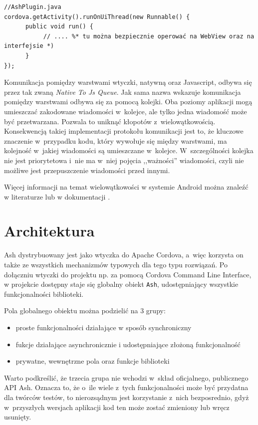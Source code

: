 \documentclass[brudnopis]{xmgr}
\begin{document}
\begin{lstlisting}
//AshPlugin.java
cordova.getActivity().runOnUiThread(new Runnable() {
      public void run() {
           // .... %* tu można bezpiecznie operować na WebView oraz na interfejsie *)
      }
});
\end{lstlisting}

Komunikacja pomiędzy warstwami wtyczki, natywną oraz Javascript, odbywa się przez tak zwaną \textit{Native To Js Queue}. Jak sama nazwa wskazuje komunikacja pomiędzy warstwami odbywa się za pomocą kolejki. Oba poziomy aplikacji mogą umieszczać zakodowane wiadomości w~kolejce, ale tylko jedna wiadomość może być przetwarzana. Pozwala to uniknąć kłopotów z~wielowątkowością. Konsekwencją takiej implementacji protokołu komunikacji jest to, że kluczowe znaczenie w~przypadku kodu, który wywołuje się między warstwami,  ma kolejność w~jakiej wiadomości są umieszczane w~kolejce. W~szczególności kolejka nie jest priorytetowa i~nie ma w~niej pojęcia ,,ważności'' wiadomości, czyli nie możliwe jest przepuszczenie wiadomości przed innymi.

Więcej informacji na temat wielowątkowości w systemie Android można znaleźć w literaturze \cite{AndroidInPractice} lub w dokumentacji \cite{AndroidDoc}. 

\chapter{Architektura}

Ash dystrybuowany jest jako wtyczka do Apache Cordova, a~więc korzysta on także ze wszystkich mechanizmów typowych dla tego typu rozwiązań. Po dołączniu wtyczki do projektu np. za pomocą Cordova Command Line Interface, w projekcie dostępny staje się globalny obiekt \texttt{Ash}, udostępniający wszystkie funkcjonalności biblioteki. 

Pola globalnego obiektu można podzielić na 3 grupy:  
\begin{itemize}
  \item proste funkcjonalności działające w sposób synchroniczny
  \item fukcje działające asynchronicznie i udostępniające złożoną funkcjonalność 
  \item prywatne, wewnętrzne pola oraz funkcje biblioteki
\end{itemize}
Warto podkreślić, że trzecia grupa nie wchodzi w~skład oficjalnego, publicznego API Ash. Oznacza to, że o~ile wiele z~tych funkcjonalności może być przydatna dla twórców testów, to nierozsądnym jest korzystanie z~nich bezposrednio, gdyż w~przyszłych wersjach aplikacji kod ten może zostać zmieniony lub wręcz usunięty.
\end{document}
